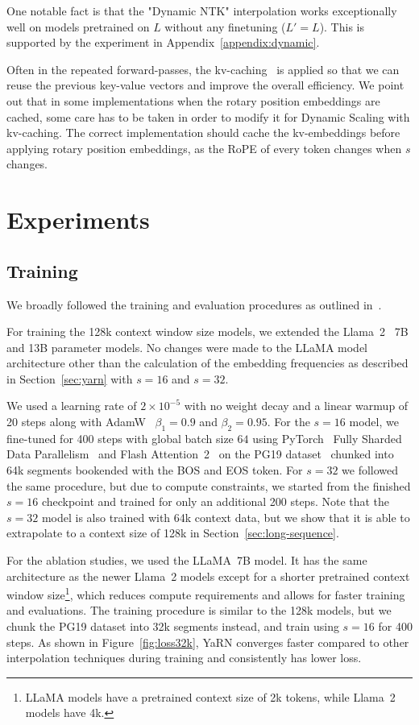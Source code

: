 One notable fact is that the "Dynamic NTK" interpolation works exceptionally well on models pretrained on $L$ without any finetuning ($L'=L$). This is supported by the experiment in Appendix~\ref{appendix:dynamic}.

Often in the repeated forward-passes, the kv-caching~\citep{kvcaching} is applied so that we can reuse the previous key-value vectors and improve the overall efficiency. We point out that in some implementations when the rotary position embeddings are cached, some care has to be taken in order to modify it for Dynamic Scaling with kv-caching. The correct implementation should cache the kv-embeddings before applying rotary position embeddings, as the RoPE of every token changes when $s$ changes.

\section{Experiments}\label{sec:experiments}

\subsection{Training}
We broadly followed the training and evaluation procedures as outlined in~\cite{chen2023extending}.

For training the 128k context window size models, we extended the Llama~2~\citep{touvron2023llama2} 7B and 13B parameter models. No changes were made to the LLaMA model architecture other than the calculation of the embedding frequencies as described in Section~\ref{sec:yarn} with $s=16$ and $s=32$.

We used a learning rate of $2 \times 10^{-5}$ with no weight decay and a linear warmup of 20 steps along with AdamW~\citep{loshchilov2018decoupled} $\beta_1=0.9$ and $\beta_2=0.95$.
For the $s=16$ model, we fine-tuned for 400 steps with global batch size $64$ using PyTorch~\citep{pytorch} Fully Sharded Data Parallelism~\citep{zhao2023pytorch} and Flash Attention~2~\citep{dao2023flashattention2} on the PG19 dataset~\citep{Rae2020Compressive} chunked into 64k segments bookended with the BOS and EOS token. For $s=32$ we followed the same procedure, but due to compute constraints, we started from the finished $s=16$ checkpoint and trained for only an additional 200 steps. Note that the $s=32$ model is also trained with 64k context data, but we show that it is able to extrapolate to a context size of 128k in Section~\ref{sec:long-sequence}.

For the ablation studies, we used the LLaMA~7B model. It has the same architecture as the newer Llama~2 models except for a shorter pretrained context window size\footnote{LLaMA models have a pretrained context size of 2k tokens, while Llama~2 models have 4k.}, which reduces compute requirements and allows for faster training and evaluations. The training procedure is similar to the 128k models, but we chunk the PG19 dataset into 32k segments instead, and train using $s=16$ for 400 steps. As shown in Figure~\ref{fig:loss32k}, YaRN converges faster compared to other interpolation techniques during training and consistently has lower loss.

